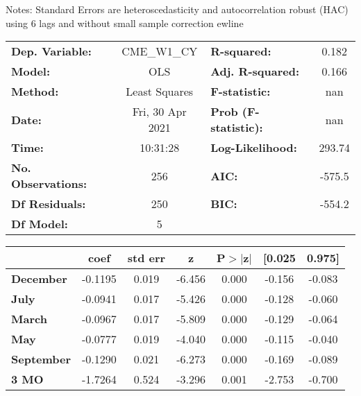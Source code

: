 Notes: \newline
 [1] Standard Errors are heteroscedasticity and autocorrelation robust (HAC) using 6 lags and without small sample correction
ewline\begin{center}
\begin{tabular}{lclc}
\toprule
\textbf{Dep. Variable:}    &   CME\_W1\_CY    & \textbf{  R-squared:         } &     0.182   \\
\textbf{Model:}            &       OLS        & \textbf{  Adj. R-squared:    } &     0.166   \\
\textbf{Method:}           &  Least Squares   & \textbf{  F-statistic:       } &       nan   \\
\textbf{Date:}             & Fri, 30 Apr 2021 & \textbf{  Prob (F-statistic):} &      nan    \\
\textbf{Time:}             &     10:31:28     & \textbf{  Log-Likelihood:    } &    293.74   \\
\textbf{No. Observations:} &         256      & \textbf{  AIC:               } &    -575.5   \\
\textbf{Df Residuals:}     &         250      & \textbf{  BIC:               } &    -554.2   \\
\textbf{Df Model:}         &           5      & \textbf{                     } &             \\
\bottomrule
\end{tabular}
\begin{tabular}{lcccccc}
                   & \textbf{coef} & \textbf{std err} & \textbf{z} & \textbf{P$> |$z$|$} & \textbf{[0.025} & \textbf{0.975]}  \\
\midrule
\textbf{December}  &      -0.1195  &        0.019     &    -6.456  &         0.000        &       -0.156    &       -0.083     \\
\textbf{July}      &      -0.0941  &        0.017     &    -5.426  &         0.000        &       -0.128    &       -0.060     \\
\textbf{March}     &      -0.0967  &        0.017     &    -5.809  &         0.000        &       -0.129    &       -0.064     \\
\textbf{May}       &      -0.0777  &        0.019     &    -4.040  &         0.000        &       -0.115    &       -0.040     \\
\textbf{September} &      -0.1290  &        0.021     &    -6.273  &         0.000        &       -0.169    &       -0.089     \\
\textbf{3 MO}      &      -1.7264  &        0.524     &    -3.296  &         0.001        &       -2.753    &       -0.700     \\

\end{tabular}
\end{center}
